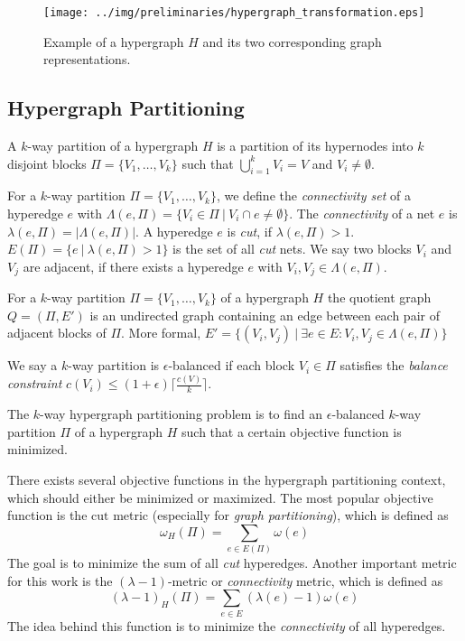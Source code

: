 \begin{figure}
\centering
\texttt{[image: ../img/preliminaries/hypergraph\_transformation.eps]}
\caption{Example of a hypergraph $H$ and its two corresponding graph representations.} 
\label{img:hypergraph_transformation}
\end{figure}

\subsection{Hypergraph Partitioning}
\label{sec:hypergraph_partitioning}

\begin{definition}
A $k$-way partition of a hypergraph $H$ is a partition of its hypernodes into
$k$ disjoint blocks $\Pi = \{V_1,\ldots,V_k\}$ such that $\bigcup_{i=1}^{k} V_i = V$
and $V_i \neq \emptyset$.
\label{def:kway_partition}
\end{definition}

For a $k$-way partition $\Pi = \{V_1,\ldots,V_k\}$, we define the \emph{connectivity set} of a
hyperedge $e$ with $\Lambda(e,\Pi) = \{V_i \in \Pi\ |\ V_i \cap e \neq \emptyset\}$. The \emph{connectivity}
of a net $e$ is $\lambda(e,\Pi) = |\Lambda(e,\Pi)|$. A hyperedge $e$ is \emph{cut}, if
$\lambda(e,\Pi) > 1$. $E(\Pi) = \{e\ |\ \lambda(e,\Pi) > 1\}$ is the set of all \emph{cut} 
nets. We say two blocks $V_i$ and $V_j$ are adjacent, if there exists a hyperedge
$e$ with $V_i,V_j \in \Lambda(e,\Pi)$.

\begin{definition}
For a $k$-way partition $\Pi = \{V_1,\ldots,V_k\}$ of a hypergraph $H$ 
the quotient graph $Q = (\Pi,E')$ is an undirected graph containing an 
edge between each pair of adjacent blocks of $\Pi$.
More formal, $E' = \{(V_i,V_j)\ |\ \exists e \in E: V_i,V_j \in \Lambda(e,\Pi)\}$
\label{def:quotient_graph}
\end{definition}

We say a $k$-way partition is $\epsilon$-balanced if each block 
$V_i \in \Pi$ satisfies the \emph{balance constraint} 
$c(V_i) \le (1+\epsilon)\lceil\frac{c(V)}{k}\rceil$.

\begin{definition}
The $k$-way hypergraph partitioning problem is to find an $\epsilon$-balanced $k$-way
partition $\Pi$ of a hypergraph $H$ such that a certain objective function is minimized.
\label{def:kway_partitioning_problem}
\end{definition}

There exists several objective functions in the hypergraph partitioning context,
which should either be minimized or maximized. The most popular objective function 
is the $\text{cut}$ metric (especially for \emph{graph partitioning}), which is defined as
\[\omega_H(\Pi) = \sum_{e \in E(\Pi)} \omega(e)\]
The goal is to minimize the sum of all \emph{cut} hyperedges. Another important metric
for this work is the $(\lambda - 1)$-metric or \emph{connectivity} metric, 
which is defined as
\[(\lambda - 1)_H(\Pi) = \sum_{e \in E} (\lambda(e) - 1)\omega(e)\]
The idea behind this function is to minimize the \emph{connectivity} of all hyperedges.